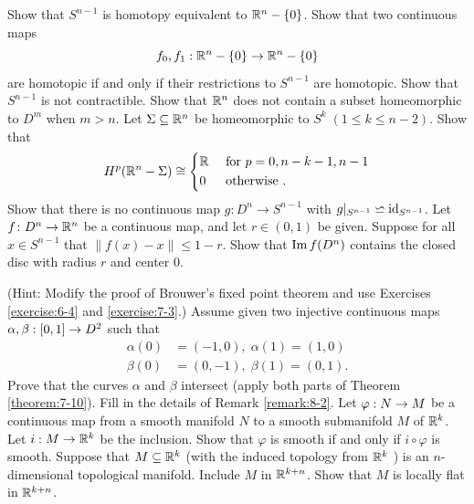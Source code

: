 \begin{enumerate}[label=\theexercise.\arabic*.,ref=\theexercise.\arabic*,leftmargin=2.7em]
  \NewItem Show that ${S}^{n- 1}$ is homotopy equivalent to ${{\mathbb{R}}}^{n}- \{ 0\}$. Show that two continuous maps
    \[
      {f}_{0},{f}_{1} : {\mathbb{R}}^{n}- \{ 0\}  \rightarrow  {\ensuremath{\mathbb{R}}}^{n}- \{ 0\}
    \]
    are homotopic if and only if their restrictions to ${S}^{n- 1}$ are homotopic.
  \NewItem Show that ${S}^{n- 1}$ is not contractible.
  \newchap[7]
  \NewItem Show that ${\mathbb{R}}^n$ does not contain a subset homeomorphic to $D^m$ when $m > n$.
  \NewItem Let $\Sigma\subseteq{\ensuremath{\mathbb{R}}}^n$ be homeomorphic
    to $S^k\; (1\le k\le n-2)$. Show that
    \begin{align*}
      H^p({\mathbb{R}}^n-\Sigma) \cong \left\{\begin{aligned}
                                        & {\mathbb{R}} &  & \text{ for } p=0, n-k-1, n-1 \\
                                        & 0   &  & \text{ otherwise }.
                                      \end{aligned}\right.
    \end{align*}
  \NewItem Show that there is no continuous map $g:D^n\to S^{n-1}$ with $g|_{S^{n-1}}\backsimeq \operatorname{id}_{S^{n-1}}$.
  \NewItem Let $f\colon {D}^{n} \rightarrow  {\ensuremath{\mathbb{R}}}^{n}$ be a continuous map, and let $r \in  ( {0,1})$ be given. Suppose for all $x \in  {S}^{n- 1}$ that $\| f( x) - x\|  \leq  1- r$. Show that $\operatorname{Im} f( {D}^{n})$ contains the closed disc with radius $r$ and center 0.\par
    \par(Hint: Modify the proof of Brouwer's fixed point theorem and use Exercises \ref{exercise:6-4} and \ref{exercise:7-3}.)
  \NewItem Assume given two injective continuous maps $\alpha,\beta  : [  {0,1}]   \rightarrow  {D}^{2}$ such that
    \[
    \begin{aligned}
      \alpha ( 0)  & = ( {-1,0}),\;\alpha ( 1)  = ( {1,0}) \\
      \beta ( 0)  & = ( {0,- 1}),\;\beta ( 1)  = ( {0,1}).
    \end{aligned}
    \]
    Prove that the curves $\alpha$ and $\beta$ intersect (apply both parts of Theorem \ref{theorem:7-10}).
  \newchap[8]
  \NewItem Fill in the details of Remark \ref{remark:8-2}.
  \NewItem Let $\varphi  : N \rightarrow  M$ be a continuous map from a smooth manifold $N$ to a smooth submanifold $M$ of ${\mathbb{R}}^{k}$. Let $i : M \rightarrow  {\ensuremath{\mathbb{R}}}^{k}$ be the inclusion. Show that $\varphi$ is smooth if and only if $i \circ  \varphi$ is smooth.
  \NewItem Suppose that $M \subseteq  {\ensuremath{\mathbb{R}}}^{k}$ (with the induced topology from ${\mathbb{R}}^{k}$ ) is an $n$- dimensional topological manifold. Include $M$ in ${\mathbb{R}}^{k + n}$. Show that $M$ is locally flat in ${\mathbb{R}}^{k + n}$.

\end{enumerate}
